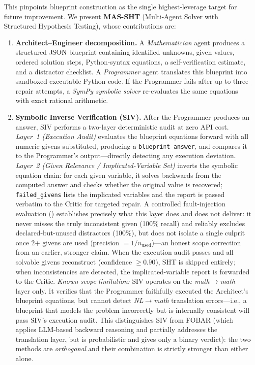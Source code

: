 \documentclass[11pt,a4paper]{article}
\begin{document}
This pinpoints blueprint construction as the single highest-leverage target for future improvement.
We present \textbf{MAS-SHT} (Multi-Agent Solver with Structured Hypothesis Testing), whose contributions are:
\begin{enumerate}[leftmargin=*,itemsep=3pt]
    \item \textbf{Architect--Engineer decomposition.} A \emph{Mathematician} agent produces a structured JSON blueprint containing identified unknowns, given values, ordered solution steps, Python-syntax equations, a self-verification estimate, and a distractor checklist. A \emph{Programmer} agent translates this blueprint into sandboxed executable Python code. If the Programmer fails after up to three repair attempts, a \emph{SymPy symbolic solver} re-evaluates the same equations with exact rational arithmetic.
    \item \textbf{Symbolic Inverse Verification (SIV).} After the Programmer produces an answer, SIV performs a two-layer deterministic audit at zero API cost.
    \emph{Layer~1 (Execution Audit)} evaluates the blueprint equations forward with all numeric givens substituted, producing a \texttt{blueprint\_answer}, and compares it to the Programmer's output---directly detecting any execution deviation.
    \emph{Layer~2 (Given Relevance / Implicated-Variable Set)} inverts the symbolic equation chain: for each given variable, it solves backwards from the computed answer and checks whether the original value is recovered; \texttt{failed\_givens} lists the implicated variables and the report is passed verbatim to the Critic for targeted repair. A controlled fault-injection evaluation () establishes precisely what this layer does and does not deliver: it never misses the truly inconsistent given (100\% recall) and reliably excludes declared-but-unused distractors (100\%), but does not isolate a single culprit once 2+ givens are used (precision $=1/n_{\text{used}}$)---an honest scope correction from an earlier, stronger claim.
    When the execution audit passes and all solvable givens reconstruct (confidence $\geq 0.90$), SHT is skipped entirely; when inconsistencies are detected, the implicated-variable report is forwarded to the Critic.
    \emph{Known scope limitation:} SIV operates on the \emph{math$\to$math} layer only. It verifies that the Programmer faithfully executed the Architect's blueprint equations, but cannot detect \emph{NL$\to$math} translation errors---i.e., a blueprint that models the problem incorrectly but is internally consistent will pass SIV's execution audit. This distinguishes SIV from FOBAR \citep{jiang2024fobar} (which applies LLM-based backward reasoning and partially addresses the translation layer, but is probabilistic and gives only a binary verdict): the two methods are \emph{orthogonal} and their combination is strictly stronger than either alone.

\end{enumerate}
\end{document}
